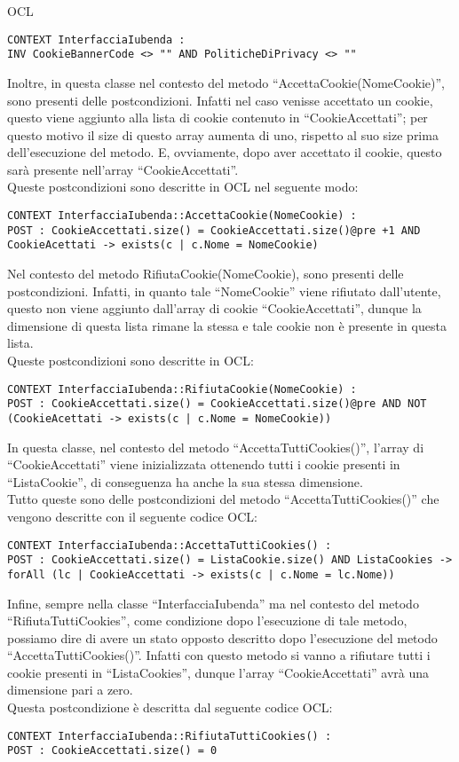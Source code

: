 \begin{listaPersonale}{OCL}
        \begin{lstlisting}
CONTEXT InterfacciaIubenda :
INV CookieBannerCode <> "" AND PoliticheDiPrivacy <> ""
    \end{lstlisting}
        Inoltre, in questa classe nel contesto del metodo “AccettaCookie(NomeCookie)”, sono presenti delle postcondizioni. Infatti nel caso venisse accettato un cookie, questo viene aggiunto alla lista di cookie contenuto in “CookieAccettati”; per questo motivo il size di questo array aumenta di uno, rispetto al suo size prima dell'esecuzione del metodo. E, ovviamente, dopo aver accettato il cookie, questo sarà presente nell'array “CookieAccettati”. \\
        Queste postcondizioni sono descritte in OCL nel seguente modo:
        \begin{lstlisting}
CONTEXT InterfacciaIubenda::AccettaCookie(NomeCookie) :
POST : CookieAccettati.size() = CookieAccettati.size()@pre +1 AND CookieAcettati -> exists(c | c.Nome = NomeCookie)
    \end{lstlisting}
        Nel contesto del metodo RifiutaCookie(NomeCookie), sono presenti delle postcondizioni. Infatti, in quanto tale “NomeCookie” viene rifiutato dall'utente, questo non viene aggiunto dall'array di cookie “CookieAccettati”, dunque la dimensione di questa lista rimane la stessa e tale cookie non è presente in questa lista.\\
        Queste postcondizioni sono descritte in OCL:
        \begin{lstlisting}
CONTEXT InterfacciaIubenda::RifiutaCookie(NomeCookie) :
POST : CookieAccettati.size() = CookieAccettati.size()@pre AND NOT (CookieAcettati -> exists(c | c.Nome = NomeCookie))
    \end{lstlisting}
        In questa classe, nel contesto del metodo “AccettaTuttiCookies()”, l'array di “CookieAccettati” viene inizializzata ottenendo tutti i cookie presenti in “ListaCookie”, di conseguenza ha anche la sua stessa dimensione. \\
        Tutto queste sono delle postcondizioni del metodo “AccettaTuttiCookies()” che vengono descritte con il seguente codice OCL:
        \begin{lstlisting}
CONTEXT InterfacciaIubenda::AccettaTuttiCookies() :
POST : CookieAccettati.size() = ListaCookie.size() AND ListaCookies -> forAll (lc | CookieAccettati -> exists(c | c.Nome = lc.Nome))
    \end{lstlisting}
        Infine, sempre nella classe “InterfacciaIubenda” ma nel contesto del metodo “RifiutaTuttiCookies”, come condizione dopo l'esecuzione di tale metodo, possiamo dire di avere un stato opposto descritto dopo l'esecuzione del metodo “AccettaTuttiCookies()”. Infatti con questo metodo si vanno a rifiutare tutti i cookie presenti in “ListaCookies”, dunque l'array “CookieAccettati” avrà una dimensione pari a zero.\\
        Questa postcondizione è descritta dal seguente codice OCL:
        \begin{lstlisting}
CONTEXT InterfacciaIubenda::RifiutaTuttiCookies() :
POST : CookieAccettati.size() = 0
    \end{lstlisting}





\end{listaPersonale}
